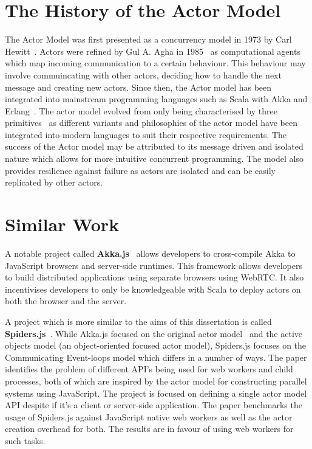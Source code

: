 \documentclass[12pt, a4paper]{report}
\theoremstyle{definition}
\theoremstyle{definition}%
\theoremstyle{definition}%
\theoremstyle{definition}%
\theoremstyle{definition}%
\theoremstyle{definition}%
\begin{document}
\section{The History of the Actor Model}
The Actor Model was first presented as a concurrency model in 1973 by Carl Hewitt~\cite{hewitt1973session}. Actors were refined by Gul A. Agha in 1985~\cite{agha1985actors} as computational agents which map incoming communication to a certain behaviour. This behaviour may involve commuincating with other actors, deciding how to handle the next message and creating new actors. Since then, the Actor model has been integrated into mainstream programming languages such as Scala with Akka and Erlang~\cite{43years}\cite{haller2012integration}. The actor model evolved from only being characterised by three primitives~\cite{agha1985actors} as different variants and philosophies of the actor model have been integrated into modern languages to suit their respective requirements. The success of the Actor model may be attributed to its message driven and isolated nature which allows for more intuitive concurrent programming. The model also provides resilience against failure as actors are isolated and can be easily replicated by other actors\cite{reactivemanifesto}.
\section{Similar Work}
A notable project called \textbf{Akka.js}~\cite{stivan2015akka} allows developers to cross-compile Akka to JavaScript browsers and server-side runtimes. This framework allows developers to build distributed applications using separate browsers using WebRTC. It also incentivises developers to only be knowledgeable with Scala to deploy actors on both the browser and the server.

A project which is more similar to the aims of this dissertation is called \textbf{Spiders.js}~\cite{spidersjs}. While Akka.js focused on the original actor model~\cite{agha1985actors} and the active objects model (an object-oriented focused actor model), Spiders.js focuses on the Communicating Event-loops model which differs in a number of ways. The paper identifies the problem of different API's being used for web workers and child processes, both of which are inspired by the actor model for constructing parallel systems using JavaScript. The project is focused on defining a single actor model API despite if it's a client or server-side application. The paper benchmarks the usage of Spiders.js against JavaScript native web workers as well as the actor creation overhead for both. The results are in favour of using web workers for such tasks.
\end{document}
